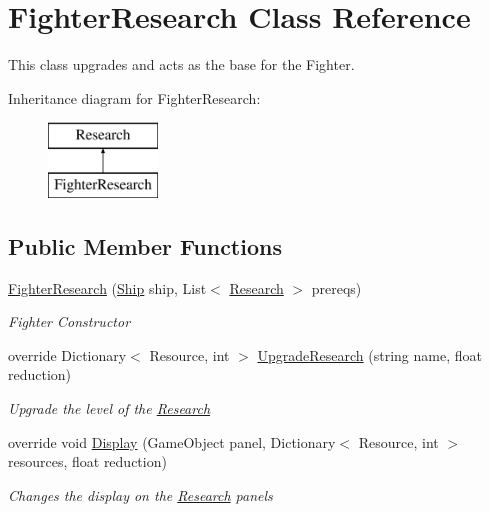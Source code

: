 \hypertarget{class_fighter_research}{}\section{Fighter\+Research Class Reference}
\label{class_fighter_research}


This class upgrades and acts as the base for the Fighter.  


Inheritance diagram for Fighter\+Research\+:\begin{figure}[H]
\begin{center}
\leavevmode
\includegraphics[height=2.000000cm]{class_fighter_research}
\end{center}
\end{figure}
\subsection*{Public Member Functions}
\begin{DoxyCompactItemize}
\item 
\hyperlink{class_fighter_research_afb6786a6a73abbb31f1fb9ff8ad8d0ae}{Fighter\+Research} (\hyperlink{class_ship}{Ship} ship, List$<$ \hyperlink{class_research}{Research} $>$ prereqs)
\begin{DoxyCompactList}\small\item\em Fighter Constructor \end{DoxyCompactList}\item 
override Dictionary$<$ Resource, int $>$ \hyperlink{class_fighter_research_afd5beebea869ceeb759f36689cd2525b}{Upgrade\+Research} (string name, float reduction)
\begin{DoxyCompactList}\small\item\em Upgrade the level of the \hyperlink{class_research}{Research} \end{DoxyCompactList}\item 
override void \hyperlink{class_fighter_research_a8097d1c69f3c46d4f8e2dc90dc47bcb9}{Display} (Game\+Object panel, Dictionary$<$ Resource, int $>$ resources, float reduction)
\begin{DoxyCompactList}\small\item\em Changes the display on the \hyperlink{class_research}{Research} panels \end{DoxyCompactList}\end{DoxyCompactItemize}
